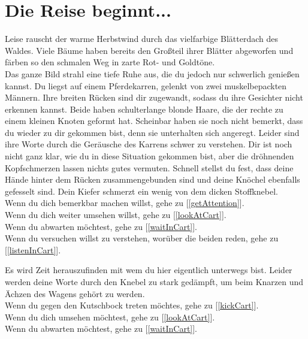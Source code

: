 \chapter{Die Reise beginnt...}

Leise rauscht der warme Herbstwind durch das vielfarbige Blätterdach des Waldes. Viele Bäume haben bereits den Großteil ihrer Blätter abgeworfen und färben so den schmalen Weg in zarte Rot- und Goldtöne.\\
Das ganze Bild strahl eine tiefe Ruhe aus, die du jedoch nur schwerlich genießen kannst. Du liegst auf einem Pferdekarren, gelenkt von zwei muskelbepackten Männern. Ihre breiten Rücken sind dir zugewandt, sodass du ihre Gesichter nicht erkennen kannst. Beide haben schulterlange blonde Haare, die der rechte zu einem kleinen Knoten geformt hat. Scheinbar haben sie noch nicht bemerkt, dass du wieder zu dir gekommen bist, denn sie unterhalten sich angeregt. Leider sind ihre Worte durch die Geräusche des Karrens schwer zu verstehen. Dir ist noch nicht ganz klar, wie du in diese Situation gekommen bist, aber die dröhnenden Kopfschmerzen lassen nichts gutes vermuten. Schnell stellst du fest, dass deine Hände hinter dem Rücken zusammengebunden sind und deine Knöchel ebenfalls gefesselt sind. Dein Kiefer schmerzt ein wenig von dem dicken Stoffknebel.
\\Wenn du dich bemerkbar machen willst, gehe zu [\ref{getAttention}].
\\Wenn du dich weiter umsehen willst, gehe zu [\ref{lookAtCart}].
\\Wenn du abwarten möchtest, gehe zu [\ref{waitInCart}].
\\Wenn du versuchen willst zu verstehen, worüber die beiden reden, gehe zu [\ref{listenInCart}].


Es wird Zeit herauszufinden mit wem du hier eigentlich unterwegs bist. Leider werden deine Worte durch den Knebel zu stark gedämpft, um beim Knarzen und Ächzen des Wagens gehört zu werden.
\\Wenn du gegen den Kutschbock treten möchtes, gehe zu [\ref{kickCart}].
\\Wenn du dich umsehen möchtest, gehe zu [\ref{lookAtCart}].
\\Wenn du abwarten möchtest, gehe zu [\ref{waitInCart}].


